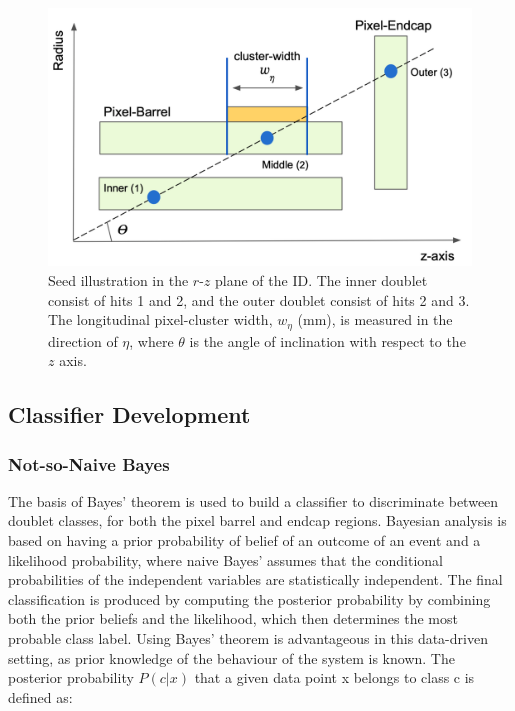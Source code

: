 \begin{figure}[!htbp]
\centering
    \includegraphics[width=0.85\linewidth]{images/4-ml-based-predictor/triplet_illustration_2.png}
    \caption{Seed illustration in the $r$-$z$ plane of the ID. The inner doublet consist of hits 1 and 2, and the outer doublet consist of hits 2 and 3. The longitudinal pixel-cluster width, $w_{\eta}$ (mm), is measured in the direction of $\eta$, where $\theta$ is the angle of inclination with respect to the $z$ axis.}
\label{fig:triplet-illustration}
\end{figure}


\subsection{Classifier Development}
\label{section:classifier-dev}

\subsubsection{Not-so-Naive Bayes}

The basis of Bayes’ theorem \cite{naive-bayes} is used to build a classifier to discriminate between doublet classes, for both the pixel barrel and endcap regions. Bayesian analysis is based on having a prior probability of belief of an outcome of an event and a likelihood probability, where naive Bayes’ assumes that the conditional probabilities of the independent variables are statistically independent. The final classification is produced by computing the posterior probability by combining both the prior beliefs and the likelihood, which then determines the most probable class label. Using Bayes’ theorem is advantageous in this data-driven setting, as prior knowledge of the behaviour of the system is known. The posterior probability $P(c|x)$ that a given data point x belongs to class c is defined as:

